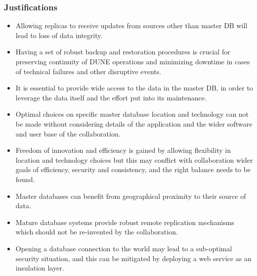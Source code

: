 \subsubsection{Justifications}
\begin{itemize}

\item Allowing replicas to receive updates from sources other than master DB will lead to loss of data integrity.

\item Having a set of robust backup and restoration procedures is crucial for preserving continuity of DUNE operations and minimizing downtime in cases of technical failures and other disruptive events.

\item It is essential to provide wide access to the data in the master DB, in order to leverage the data itself and the effort put into its maintenance.

\item Optimal choices on specific master database location and technology can not be made without considering details of the application and the wider software and user base of the collaboration.

\item Freedom of innovation and efficiency is gained by allowing flexibility in location and technology choices but 
this may conflict with collaboration wider goals of efficiency, security and consistency, and the right balance needs to be found.

\item Master databases can benefit from geographical proximity to their source of data.

\item Mature database systems provide robust remote replication mechanisms which should not be re-invented by the collaboration.

\item Opening a database connection to the world may lead to a sub-optimal security situation, and this can be mitigated by deploying 
a web service as an insulation layer.

\end{itemize}

